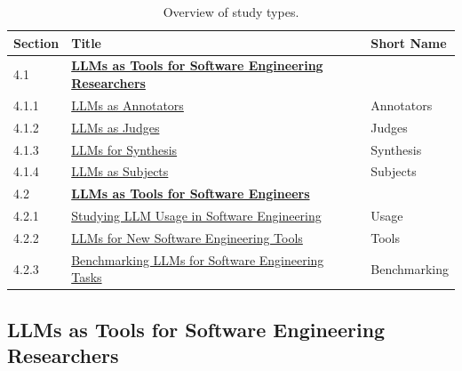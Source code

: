 \documentclass[smallextended]{svjour3}
\begin{document}
\begin{table}[tb]
\centering
\caption{Overview of study types.}
\label{tab:study-types}
\begin{tabular}{@{}lll@{}}
\toprule
\textbf{Section} & \textbf{Title} & \textbf{Short Name} \\
\midrule
4.1   & \textbf{\hyperref[sec:llms-as-tools-for-software-engineering-researchers]{LLMs as Tools for Software Engineering Researchers}}                 &            \\
4.1.1 & \quad \hyperref[sec:llms-as-annotators]{LLMs as Annotators}                                                                                  & Annotators \\
4.1.2 & \quad \hyperref[sec:llms-as-judges]{LLMs as Judges}                                                                                          & Judges     \\
4.1.3 & \quad \hyperref[sec:llms-for-synthesis]{LLMs for Synthesis}                                                                                  & Synthesis  \\
4.1.4 & \quad \hyperref[sec:llms-as-subjects]{LLMs as Subjects}                                                                                      & Subjects   \\
\midrule
4.2   & \textbf{\hyperref[sec:llms-as-tools-for-software-engineers]{LLMs as Tools for Software Engineers}}                                           &            \\
4.2.1 & \quad \hyperref[sec:studying-llm-usage-in-software-engineering]{Studying LLM Usage in Software Engineering}                                  & Usage      \\
4.2.2 & \quad \hyperref[sec:llms-for-new-software-engineering-tools]{LLMs for New Software Engineering Tools}                                        & Tools      \\
4.2.3 & \quad \hyperref[sec:benchmarking-llms-for-software-engineering-tasks]{Benchmarking LLMs for Software Engineering Tasks}                      & Benchmarking \\
\bottomrule
\end{tabular}
\end{table}

\subsection{LLMs as Tools for Software Engineering Researchers}
\label{sec:llms-as-tools-for-software-engineering-researchers}
\end{document}
